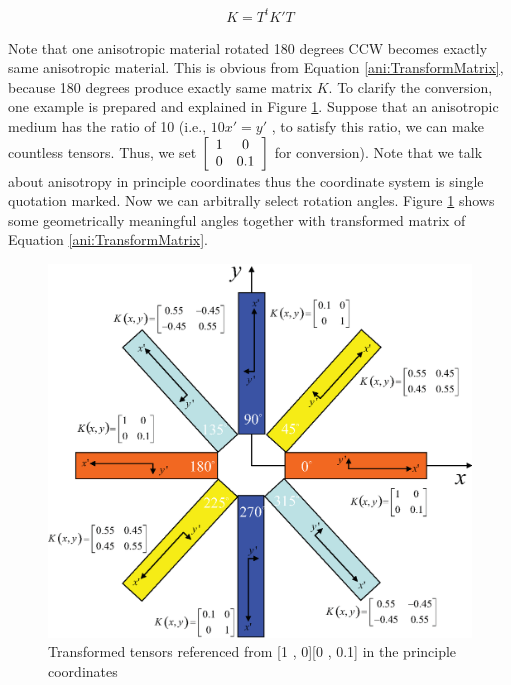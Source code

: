 \begin{eqnarray}
\label{ani:TransformMatrix}
K = T^t K'T
\end{eqnarray}

Note that one anisotropic material rotated 180 degrees CCW becomes exactly same anisotropic material. This is obvious from Equation \ref{ani:TransformMatrix}, because 180 degrees produce exactly same matrix $K$.
To clarify the conversion, one example is prepared and explained in Figure \ref{ani:tensordiagram}. Suppose that an anisotropic medium has the ratio of 10 (i.e., $10x' = y'$ , to satisfy this ratio, we can make countless tensors. Thus, we set $\left[ {\begin{array}{*{20}c}   1 & 0  \\  0 & {0.1}  \\ \end{array}} \right]$ for conversion). Note that we talk about anisotropy in principle coordinates thus the coordinate system is single quotation marked. Now we can arbitrally select rotation angles. Figure \ref{ani:tensordiagram} shows some geometrically meaningful angles together with transformed matrix of Equation \ref{ani:TransformMatrix}.

\begin{figure}[H]
\centering
\includegraphics[scale=0.60]{Anisotropy/figures/tensordiagram.eps}
\caption{Transformed tensors referenced from
[1 , 0][0 , 0.1]
in the principle coordinates}
\label{ani:tensordiagram}
\end{figure}

